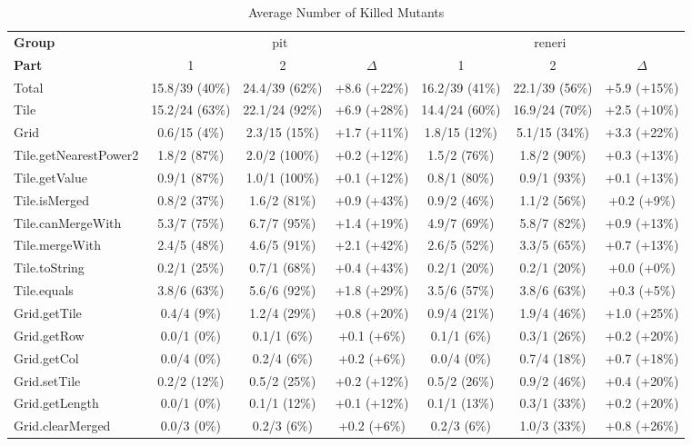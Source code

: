 \begin{sidewaystable}
\centering
\caption{Average Number of Killed Mutants}
\label{tab:average_number_of_killed_mutants}
\begin{tabular}{lcccccc}
\toprule
\textbf{Group} & \multicolumn{3}{c}{pit} & \multicolumn{3}{c}{reneri} \\
\textbf{Part} & 1 & 2 & $\Delta$ & 1 & 2 & $\Delta$ \\
\cmidrule(lr){1-1} \cmidrule(lr){2-4} \cmidrule(lr){5-7}
Total & 15.8/39 (40\%) & 24.4/39 (62\%) & +8.6 (+22\%) & 16.2/39 (41\%) & 22.1/39 (56\%) & +5.9 (+15\%) \\
\cmidrule(lr){1-1} \cmidrule(lr){2-4} \cmidrule(lr){5-7}
Tile & 15.2/24 (63\%) & 22.1/24 (92\%) & +6.9 (+28\%) & 14.4/24 (60\%) & 16.9/24 (70\%) & +2.5 (+10\%) \\
Grid & 0.6/15 (4\%) & 2.3/15 (15\%) & +1.7 (+11\%) & 1.8/15 (12\%) & 5.1/15 (34\%) & +3.3 (+22\%) \\
\cmidrule(lr){1-1} \cmidrule(lr){2-4} \cmidrule(lr){5-7}
Tile.getNearestPower2 & 1.8/2 (87\%) & 2.0/2 (100\%) & +0.2 (+12\%) & 1.5/2 (76\%) & 1.8/2 (90\%) & +0.3 (+13\%) \\
Tile.getValue & 0.9/1 (87\%) & 1.0/1 (100\%) & +0.1 (+12\%) & 0.8/1 (80\%) & 0.9/1 (93\%) & +0.1 (+13\%) \\
Tile.isMerged & 0.8/2 (37\%) & 1.6/2 (81\%) & +0.9 (+43\%) & 0.9/2 (46\%) & 1.1/2 (56\%) & +0.2 (+9\%) \\
Tile.canMergeWith & 5.3/7 (75\%) & 6.7/7 (95\%) & +1.4 (+19\%) & 4.9/7 (69\%) & 5.8/7 (82\%) & +0.9 (+13\%) \\
Tile.mergeWith & 2.4/5 (48\%) & 4.6/5 (91\%) & +2.1 (+42\%) & 2.6/5 (52\%) & 3.3/5 (65\%) & +0.7 (+13\%) \\
Tile.toString & 0.2/1 (25\%) & 0.7/1 (68\%) & +0.4 (+43\%) & 0.2/1 (20\%) & 0.2/1 (20\%) & +0.0 (+0\%) \\
Tile.equals & 3.8/6 (63\%) & 5.6/6 (92\%) & +1.8 (+29\%) & 3.5/6 (57\%) & 3.8/6 (63\%) & +0.3 (+5\%) \\
Grid.getTile & 0.4/4 (9\%) & 1.2/4 (29\%) & +0.8 (+20\%) & 0.9/4 (21\%) & 1.9/4 (46\%) & +1.0 (+25\%) \\
Grid.getRow & 0.0/1 (0\%) & 0.1/1 (6\%) & +0.1 (+6\%) & 0.1/1 (6\%) & 0.3/1 (26\%) & +0.2 (+20\%) \\
Grid.getCol & 0.0/4 (0\%) & 0.2/4 (6\%) & +0.2 (+6\%) & 0.0/4 (0\%) & 0.7/4 (18\%) & +0.7 (+18\%) \\
Grid.setTile & 0.2/2 (12\%) & 0.5/2 (25\%) & +0.2 (+12\%) & 0.5/2 (26\%) & 0.9/2 (46\%) & +0.4 (+20\%) \\
Grid.getLength & 0.0/1 (0\%) & 0.1/1 (12\%) & +0.1 (+12\%) & 0.1/1 (13\%) & 0.3/1 (33\%) & +0.2 (+20\%) \\
Grid.clearMerged & 0.0/3 (0\%) & 0.2/3 (6\%) & +0.2 (+6\%) & 0.2/3 (6\%) & 1.0/3 (33\%) & +0.8 (+26\%) \\
\bottomrule
\end{tabular}
\end{sidewaystable}
